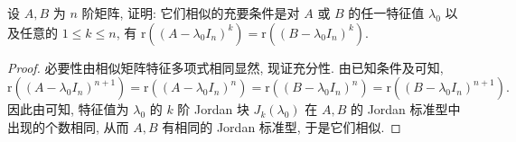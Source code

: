 \documentclass[../../main.tex]{subfiles}%
\begin{document}
\begin{proposition}\label{proposition:矩阵相似的充要条件(关于秩的充要条件)}
设 $A,B$ 为 $n$ 阶矩阵, 证明: 它们相似的充要条件是对 $A$ 或 $B$ 的任一特征值 $\lambda_0$ 以及任意的 $1 \leqslant  k \leqslant  n$, 有 $\mathrm{r}((A - \lambda_0 I_n)^k) = \mathrm{r}((B - \lambda_0 I_n)^k)$.
\end{proposition}
\begin{proof}
必要性由相似矩阵特征多项式相同显然, 现证充分性. 由已知条件及可知,
\[
\mathrm{r}((A - \lambda_0 I_n)^{n + 1}) = \mathrm{r}((A - \lambda_0 I_n)^n) = \mathrm{r}((B - \lambda_0 I_n)^n) = \mathrm{r}((B - \lambda_0 I_n)^{n + 1}).
\]
因此由可知, 特征值为 $\lambda_0$ 的 $k$ 阶 Jordan 块 $J_k(\lambda_0)$ 在 $A,B$ 的 Jordan 标准型中出现的个数相同, 从而 $A,B$ 有相同的 Jordan 标准型, 于是它们相似.
\end{proof}
\end{document}
